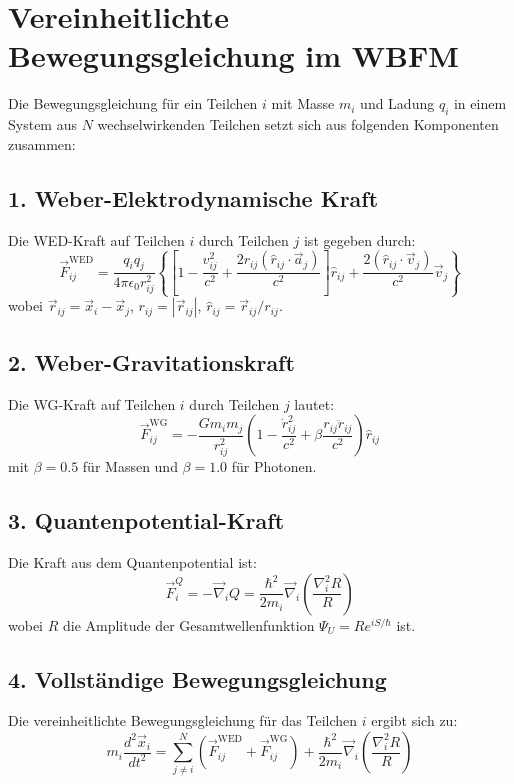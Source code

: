 \section{Vereinheitlichte Bewegungsgleichung im WBFM}
Die Bewegungsgleichung für ein Teilchen $i$ mit Masse $m_i$ und Ladung $q_i$ in einem System aus $N$ wechselwirkenden Teilchen setzt sich aus folgenden Komponenten zusammen:

\subsection*{1. Weber-Elektrodynamische Kraft}
Die WED-Kraft auf Teilchen $i$ durch Teilchen $j$ ist gegeben durch:
\[
\vec{F}_{ij}^{\mathrm{WED}} = \frac{q_i q_j}{4\pi\epsilon_0 r_{ij}^2} 
\left\{ 
\left[1 - \frac{v_{ij}^2}{c^2} + \frac{2 r_{ij} (\hat{r}_{ij} \cdot \vec{a}_j)}{c^2}\right] \hat{r}_{ij} 
+ \frac{2 (\hat{r}_{ij} \cdot \vec{v}_j)}{c^2} \vec{v}_j 
\right\}
\]
wobei $\vec{r}_{ij} = \vec{x}_i - \vec{x}_j$, $r_{ij} = |\vec{r}_{ij}|$, $\hat{r}_{ij} = \vec{r}_{ij}/r_{ij}$.

\subsection*{2. Weber-Gravitationskraft}
Die WG-Kraft auf Teilchen $i$ durch Teilchen $j$ lautet:
\[
\vec{F}_{ij}^{\mathrm{WG}} = -\frac{G m_i m_j}{r_{ij}^2} 
\left(1 - \frac{\dot{r}_{ij}^2}{c^2} + \beta \frac{r_{ij} \ddot{r}_{ij}}{c^2}\right) \hat{r}_{ij}
\]
mit $\beta = 0.5$ für Massen und $\beta = 1.0$ für Photonen.

\subsection*{3. Quantenpotential-Kraft}
Die Kraft aus dem Quantenpotential ist:
\[
\vec{F}_{i}^{Q} = -\vec{\nabla}_i Q = \frac{\hbar^2}{2m_i} \vec{\nabla}_i \left( \frac{\nabla_i^2 R}{R} \right)
\]
wobei $R$ die Amplitude der Gesamtwellenfunktion $\Psi_U = R e^{iS/\hbar}$ ist.

\subsection*{4. Vollständige Bewegungsgleichung}
Die vereinheitlichte Bewegungsgleichung für das Teilchen $i$ ergibt sich zu:
\[
\boxed{
m_i \frac{d^2 \vec{x}_i}{dt^2} = 
\sum_{j \neq i}^N \left( \vec{F}_{ij}^{\mathrm{WED}} + \vec{F}_{ij}^{\mathrm{WG}} \right) 
+ \frac{\hbar^2}{2m_i} \vec{\nabla}_i \left( \frac{\nabla_i^2 R}{R} \right)
}
\]

